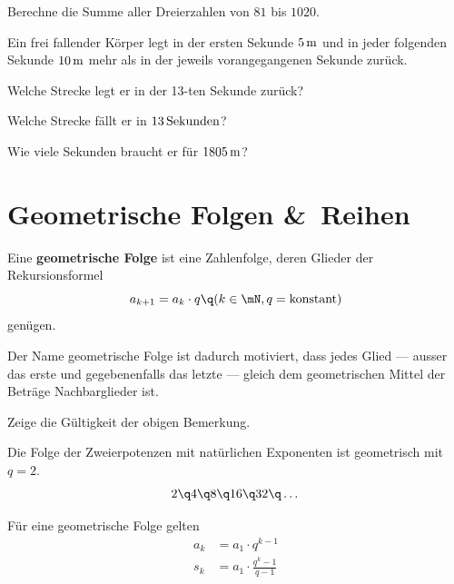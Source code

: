 \documentclass[%
11pt,%
twoside,%
titlepage,%
german,%
headsepline%
]{scrartcl}
\begin{document}
\begin{ueb}[Dreierzahlen]
Berechne die Summe aller Dreierzahlen von $81$ bis $1020$.
\end{ueb}

\begin{ueb}
Ein frei fallender K\"orper legt in der ersten Sekunde $\unit[5]{m}$ und in jeder folgenden Sekunde $\unit[10]{m}$ mehr als in der jeweils vorangegangenen Sekunde zur\"uck.
\begin{enumeratea}
\item Welche Strecke legt er in der 13-ten Sekunde zur\"uck?
\item Welche Strecke f\"allt er in $\unit[13]{Sekunden}$?
\item Wie viele Sekunden braucht er f\"ur $\unit[1805]{m}$?
\end{enumeratea}
\end{ueb}

\section{Geometrische Folgen \&\ Reihen}

\begin{cdef}{}
Eine
\textbf{geometrische Folge} ist eine Zahlenfolge, deren Glieder der Rekursionsformel
$$a_{k+1}=a_k\cdot q\q(k\in\mN, q=\text{konstant})$$
gen\"ugen.
\end{cdef}

\begin{bem}
Der Name geometrische Folge ist dadurch motiviert, dass jedes Glied --- ausser das erste und gegebenenfalls das letzte --- gleich dem geometrischen Mittel der Betr\"age Nachbarglieder ist.
\end{bem}

\begin{ueb}
Zeige die G\"ultigkeit der obigen Bemerkung.
\end{ueb}

\begin{bsp}
Die Folge der Zweierpotenzen mit nat\"urlichen Exponenten ist geometrisch mit $q=2$.
$$2\q4\q8\q16\q32\q\dots$$
\end{bsp}

\pagebreak

\begin{csatz}[GF Formeln]{}\label{geomformeln}
F\"ur eine geometrische Folge gelten
\begin{align}
a_k&=a_1\cdot q^{k-1}\label{geomglied}\\
s_k&=a_1\cdot\frac{q^k-1}{q-1}\label{geomsum}
\end{align}
\end{csatz}
\end{document}
